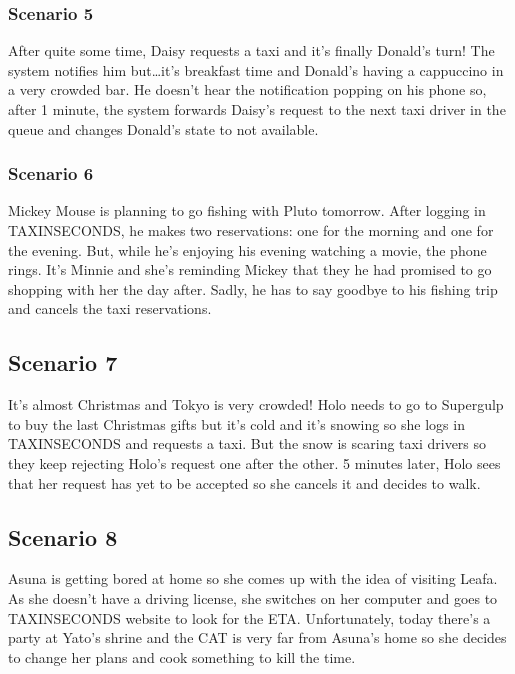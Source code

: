 \documentclass{article}
\begin{document}
\subsubsection{Scenario 5}
After quite some time, Daisy requests a taxi and it's finally Donald's turn! The system notifies him but\ldots it's breakfast time and Donald's having a cappuccino in a very crowded bar. He doesn't hear the notification popping on his phone so, after 1 minute, the system forwards Daisy's request to the next taxi driver in the queue and changes Donald's state to not available.
\subsubsection{Scenario 6}
Mickey Mouse is planning to go fishing with Pluto tomorrow. After logging in TAXINSECONDS, he makes two reservations: one for the morning and one for the evening. But, while he's enjoying his evening watching a movie, the phone rings. It's Minnie and she's reminding Mickey that they he had promised to go shopping with her the day after. Sadly, he has to say goodbye to his fishing trip and cancels the taxi reservations.
\subsection{Scenario 7}
It's almost Christmas and Tokyo is very crowded! Holo needs to go to Supergulp to buy the last Christmas gifts but it's cold and it's snowing so she logs in TAXINSECONDS and requests a taxi. But the snow is scaring taxi drivers so they keep rejecting Holo's request one after the other. 5 minutes later, Holo sees that her request has yet to be accepted so she cancels it and decides to walk.
\subsection{Scenario 8}
Asuna is getting bored at home so she comes up with the idea of visiting Leafa. As she doesn't have a driving license, she switches on her computer and goes to TAXINSECONDS website to look for the ETA. Unfortunately, today there's a party at Yato's shrine and the CAT is very far from Asuna's home so she decides to change her plans and cook something to kill the time.
\end{document}
